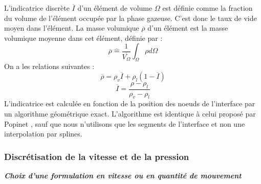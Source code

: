 L'indicatrice discrète $\overline{I}$ d'un \'el\'ement de volume $\Omega$ est d\'efinie comme la fraction du volume de l'\'el\'ement occup\'ee par la phase gazeuse. C'est donc le taux de vide moyen dans l'\'el\'ement. La masse volumique $\overline{\rho}$ d'un \'el\'ement est la masse volumique moyenne dans cet \'el\'ement, d\'efinie par :
\begin{equation}
\overline{\rho} \hat{=} \dfrac{1}{\overline{V_{\Omega}}} \int_{\Omega} \rho d\Omega
\end{equation}
On a les relations suivantes :
\begin{equation}
\overline{\rho} = \rho_{v} \overline{I} + \rho_{l} (1-\overline{I})
\end{equation}
\begin{equation}
\overline{I} = \dfrac{\rho - \rho_{l}}{\rho_{v} - \rho_{l}} \label{eq:Indicatrice_phase}
\end{equation}
L'indicatrice est calcul\'ee en fonction de la position des noeuds de l'interface par un algorithme g\'eom\'etrique exact. L'algorithme est identique \`a celui propos\'e par Popinet \cite{Popinet2000}, sauf que nous n'utilisons que les segments de l'interface et non une interpolation par splines.

\subsubsection{Discr\'etisation de la vitesse et de la pression}

\textit{\textbf{Choix d'une formulation en vitesse ou en quantit\'e de mouvement}}
\smallskip \\


